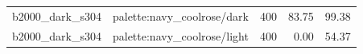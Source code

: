 \begin{longtable}{l>{\raggedright\arraybackslash}p{.42\linewidth}rrr}
b2000\_\allowbreak{}dark\_\allowbreak{}s304 & %
palette:navy\_\allowbreak{}coolrose/dark & %
400 & %
83.75 & %
99.38 \\ %

b2000\_\allowbreak{}dark\_\allowbreak{}s304 & %
palette:navy\_\allowbreak{}coolrose/light & %
400 & %
0.00 & %
54.37 \\ %


\end{longtable}
